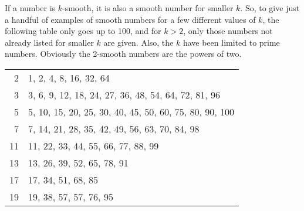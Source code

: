 \documentclass[12pt]{article}
\begin{document}
If a number is $k$-smooth, it is also a smooth number for smaller $k$. So, to give just a handful of examples of smooth numbers for a few different values of $k$, the following table only goes up to 100, and for $k > 2$, only those numbers not already listed for smaller $k$ are given. Also, the $k$ have been limited to prime numbers. Obviously the 2-smooth numbers are the powers of two.

\begin{tabular}{|r|l|}
2 & 1, 2, 4, 8, 16, 32, 64 \\
3 & 3, 6, 9, 12, 18, 24, 27, 36, 48, 54, 64, 72, 81, 96 \\
5 & 5, 10, 15, 20, 25, 30, 40, 45, 50, 60, 75, 80, 90, 100 \\
7 & 7, 14, 21, 28, 35, 42, 49, 56, 63, 70, 84, 98 \\
11 & 11, 22, 33, 44, 55, 66, 77, 88, 99 \\
13 & 13, 26, 39, 52, 65, 78, 91 \\
17 & 17, 34, 51, 68, 85 \\
19 & 19, 38, 57, 57, 76, 95 \\
\end{tabular}
\end{document}

